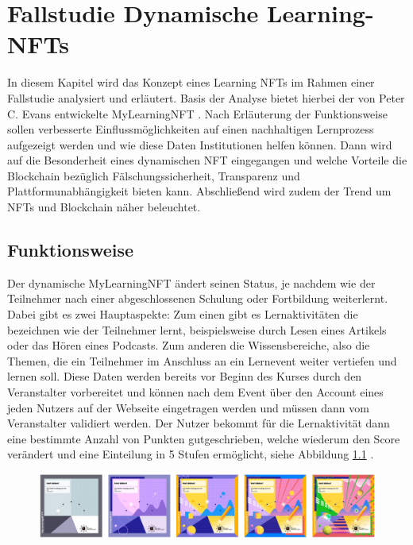 \chapter{Fallstudie Dynamische Learning-NFTs}

In diesem Kapitel wird das Konzept eines Learning \ac{NFT}s im Rahmen einer Fallstudie analysiert und erläutert.
Basis der Analyse bietet hierbei der von Peter C. Evans entwickelte MyLearning\ac{NFT} \parencite[vgl.][]{MyLearningNFT.2022}.
Nach Erläuterung der Funktionsweise sollen verbesserte Einflussmöglichkeiten auf einen nachhaltigen Lernprozess aufgezeigt werden und wie diese Daten Institutionen helfen können.
Dann wird auf die Besonderheit eines dynamischen \ac{NFT} eingegangen und welche Vorteile die Blockchain bezüglich Fälschungssicherheit, Transparenz und Plattformunabhängigkeit bieten kann.
Abschließend wird zudem der Trend um \ac{NFT}s und Blockchain näher beleuchtet. 

\section{Funktionsweise}

Der dynamische MyLearning\ac{NFT} ändert seinen Status, je nachdem wie der Teilnehmer nach einer abgeschlossenen Schulung oder Fortbildung weiterlernt.
Dabei gibt es zwei Hauptaspekte:
Zum einen gibt es Lernaktivitäten die bezeichnen wie der Teilnehmer lernt,
beispielsweise durch Lesen eines Artikels oder das Hören eines Podcasts.
Zum anderen die Wissensbereiche, also die Themen, die ein Teilnehmer im Anschluss an ein Lernevent weiter vertiefen und lernen soll.
Diese Daten werden bereits vor Beginn des Kurses durch den Veranstalter vorbereitet
und können nach dem Event über den Account eines jeden Nutzers auf der Webseite eingetragen werden und müssen dann vom Veranstalter validiert werden.
Der Nutzer bekommt für die Lernaktivität dann eine bestimmte Anzahl von Punkten gutgeschrieben, welche wiederum den Score verändert und eine Einteilung in 5 Stufen ermöglicht, siehe Abbildung \ref{stufen} \parencite[vgl.][]{MyLearningNFT.2022}.

\begin{figure}[ht]
    \includegraphics[width=15.8cm]{Bilder/Stufen.PNG}
    \centering
    \label{stufen}
\end{figure}


